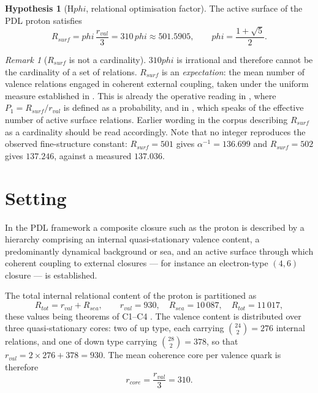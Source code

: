 \documentclass[11pt,a4paper]{article}
\def\varphi{phi}%
\def\mathrm#1{#1}%
\theoremstyle{definition}
\newtheorem{hypothesis}{Hypothesis}
\theoremstyle{plain}
\theoremstyle{remark}
\newtheorem{remark}{Remark}
\newcommand{\Rsurf}{R_{\mathrm{surf}}}
\newcommand{\Rsea}{R_{\mathrm{sea}}}
\newcommand{\Rtot}{R_{\mathrm{tot}}}
\newcommand{\rval}{r_{\mathrm{val}}}
\begin{document}
\begin{hypothesis}[H$\varphi$, relational optimisation factor]
\label{hyp:phi}
The active surface of the PDL proton satisfies
\[
\Rsurf = \varphi\,\frac{\rval}{3} = 310\,\varphi \approx 501.5905,
\qquad \varphi = \frac{1+\sqrt 5}{2}.
\]
\end{hypothesis}

\begin{remark}[$\Rsurf$ is not a cardinality]
\label{rem:cardinality}
$310\varphi$ is irrational and therefore cannot be the cardinality of a set of relations. $\Rsurf$ is an \emph{expectation}: the mean number of valence relations engaged in coherent external coupling, taken under the uniform measure established in \citet{PDL_D42}. This is already the operative reading in \citet{PDL_D39}, where $P_1 = \Rsurf/\rval$ is defined as a probability, and in \citet{PDL_D12}, which speaks of the effective number of active surface relations. Earlier wording in the corpus describing $\Rsurf$ as a cardinality should be read accordingly. Note that no integer reproduces the observed fine-structure constant: $\Rsurf = 501$ gives $\alpha^{-1} = 136.699$ and $\Rsurf = 502$ gives $137.246$, against a measured $137.036$.
\end{remark}

\section{Setting}
\label{sec:setting}

In the PDL framework a composite closure such as the proton is described by a hierarchy comprising an internal quasi-stationary valence content, a predominantly dynamical background or sea, and an active surface through which coherent coupling to external closures --- for instance an electron-type $(4,6)$ closure --- is established.

The total internal relational content of the proton is partitioned as
\begin{equation}
\Rtot = \rval + \Rsea,
\qquad \rval = 930,\quad \Rsea = 10\,087,\quad \Rtot = 11\,017,
\label{eq:global}
\end{equation}
these values being theorems of C1--C4 \citep{PDL_D16,PDL_D16a}. The valence content is distributed over three quasi-stationary cores: two of up type, each carrying $\binom{24}{2} = 276$ internal relations, and one of down type carrying $\binom{28}{2} = 378$, so that $\rval = 2 \times 276 + 378 = 930$. The mean coherence core per valence quark is therefore
\begin{equation}
r_{\mathrm{core}} = \frac{\rval}{3} = 310 .
\label{eq:rcore}
\end{equation}
\end{document}
